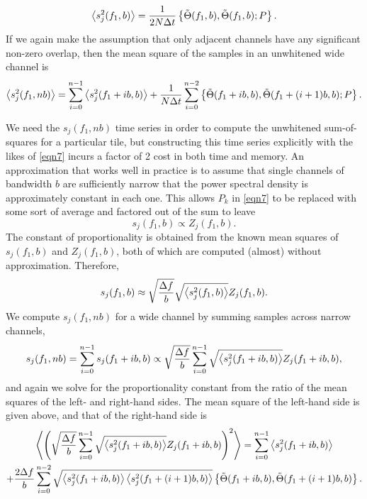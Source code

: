 \documentclass{article}
\begin{document}
\begin{equation}
\left\langle s_{j}^{2}(f_{1}, b)\right\rangle
   = \frac{1}{2 N \Delta t} \left\{ \tilde{\Theta}(f_{1}, b),
   \tilde{\Theta}(f_{1}, b); P \right\}.
\end{equation}
If we again make the assumption that only adjacent channels have any
significant non-zero overlap, then the mean square of the samples in an
unwhitened wide channel is
\begin{equation}
\left\langle s_{j}^{2}(f_{1}, n b)\right\rangle
   = \sum_{i = 0}^{n - 1} \left\langle s_{j}^{2}(f_{1} + i b, b)\right\rangle + \frac{1}{N
   \Delta t} \sum_{i = 0}^{n - 2} \left\{ \tilde{\Theta}(f_{1} + i b, b),
   \tilde{\Theta}(f_{1} + (i + 1) b, b) ; P \right\}.
\end{equation}

We need the \(s_{j}(f_{1}, n b)\) time series in order to compute the
unwhitened sum-of-squares for a particular tile, but constructing this time
series explicitly with the likes of \eqref{eqn7} incurs a factor of 2 cost
in both time and memory.  An approximation that works well in practice is
to assume that single channels of bandwidth \(b\) are sufficiently narrow
that the power spectral density is approximately constant in each one.
This allows \(P_{k}\) in \eqref{eqn7} to be replaced with some sort of
average and factored out of the sum to leave
\begin{equation}
s_{j}(f_{1}, b)
   \propto Z_{j}(f_{1}, b).
\end{equation}
The constant of proportionality is obtained from the known mean squares of
\(s_{j}(f_{1}, b)\) and \(Z_{j}(f_{1}, b)\), both of which are computed
(almost) without approximation.  Therefore,
\begin{equation}
s_{j}(f_{1}, b)
   \approx \sqrt{\frac{\Delta f}{b}} \sqrt{\left\langle s_{j}^{2}(f_{1}, b)\right\rangle}
   Z_{j}(f_{1}, b).
\end{equation}
We compute \(s_{j}(f_{1}, n b)\) for a wide channel by summing samples
across narrow channels,
\begin{equation}
s_{j}(f_{1}, n b)
   = \sum_{i = 0}^{n -1} s_{j}(f_{1} + i b, b) \propto \sqrt{\frac{\Delta
   f}{b}} \sum_{i = 0}^{n -1} \sqrt{\left\langle s_{j}^{2}(f_{1} + i b, b)\right\rangle}
   Z_{j}(f_{1} + i b, b),
\end{equation}
and again we solve for the proportionality constant from the ratio of the
mean squares of the left- and right-hand sides.  The mean square of the
left-hand side is given above, and that of the right-hand side is
\begin{multline}
\left\langle\left( \sqrt{\frac{\Delta f}{b}} \sum_{i = 0}^{n -1}
\sqrt{\left\langle s_{j}^{2}(f_{1} + i b, b)\right\rangle} Z_{j}(f_{1} + i b, b) \right)^{2}\right\rangle
   = \sum_{i = 0}^{n -1} \left\langle s_{j}^{2}(f_{1} + i b, b)\right\rangle \\+ \frac{2
   \Delta f}{b} \sum_{i = 0}^{n - 2} \sqrt{\left\langle s_{j}^{2}(f_{1} + i b, b)\right\rangle
   \left\langle s_{j}^{2}(f_{1} + (i + 1) b, b)\right\rangle} \left\{ \tilde{\Theta}(f_{1} + i
   b, b), \tilde{\Theta}(f_{1} + (i + 1) b, b) \right\}.
\end{multline}
\end{document}
